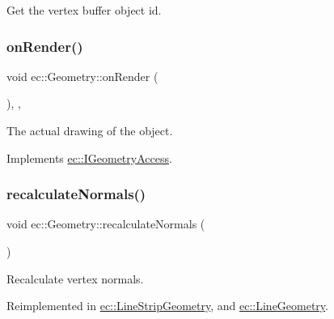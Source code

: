 Get the vertex buffer object id. 

\mbox{\label{classec_1_1_geometry_a1f166e70fc880e88092f29ef46afb836}} 
\subsubsection{\texorpdfstring{on\+Render()}{onRender()}}
{\footnotesize\ttfamily void ec\+::\+Geometry\+::on\+Render (\begin{DoxyParamCaption}{ }\end{DoxyParamCaption})\hspace{0.3cm}{\ttfamily [override]}, {\ttfamily [protected]}, {\ttfamily [virtual]}}



The actual drawing of the object. 



Implements \mbox{\hyperlink{classec_1_1_i_geometry_access_a2ee418c9fa4eb266347bae2f0ef8095b}{ec\+::\+I\+Geometry\+Access}}.

\mbox{\label{classec_1_1_geometry_a228d4a0fa01a17379f24aee2c769b501}} 
\subsubsection{\texorpdfstring{recalculate\+Normals()}{recalculateNormals()}}
{\footnotesize\ttfamily void ec\+::\+Geometry\+::recalculate\+Normals (\begin{DoxyParamCaption}{ }\end{DoxyParamCaption})\hspace{0.3cm}{\ttfamily [virtual]}}



Recalculate vertex normals. 



Reimplemented in \mbox{\hyperlink{classec_1_1_line_strip_geometry_a8b78bf56551a9536f5a2dace78ce4fcd}{ec\+::\+Line\+Strip\+Geometry}}, and \mbox{\hyperlink{classec_1_1_line_geometry_a7a0b22930aa566c97d5f86f2a8246696}{ec\+::\+Line\+Geometry}}.

\mbox{\label{classec_1_1_geometry_ad4f80cd4d4c22b108c33b9030e91467b}} 
